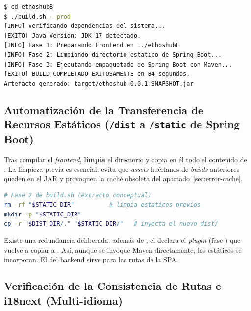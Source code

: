 \par\vspace{0.3cm}
\begin{lstlisting}[language=bash]
$ cd ethoshubB
$ ./build.sh --prod
[INFO] Verificando dependencias del sistema...
[EXITO] Java Version: JDK 17 detectado.
[INFO] Fase 1: Preparando Frontend en ../ethoshubF
[INFO] Fase 2: Limpiando directorio estatico de Spring Boot...
[INFO] Fase 3: Ejecutando empaquetado de Spring Boot con Maven...
[EXITO] BUILD COMPLETADO EXITOSAMENTE en 84 segundos.
Artefacto generado: target/ethoshub-0.0.1-SNAPSHOT.jar
\end{lstlisting}

\subsection[Transferencia de Recursos Estáticos]{Automatización de la Transferencia de Recursos Estáticos (\texttt{/dist} a \texttt{/static} de Spring Boot)}%
\label{subsec:transferencia}

Tras compilar el \textit{frontend},  \textbf{limpia} el directorio
 y copia en él todo el contenido de
. La limpieza previa es esencial: evita que \textit{assets} huérfanos de
\textit{builds} anteriores queden en el JAR y provoquen la caché obsoleta del
apartado~\ref{sec:error-cache}.\par

\begin{lstlisting}[language=bash]
# Fase 2 de build.sh (extracto conceptual)
rm -rf "$STATIC_DIR"          # limpia estaticos previos
mkdir -p "$STATIC_DIR"
cp -r "$DIST_DIR/." "$STATIC_DIR/"   # inyecta el nuevo dist/
\end{lstlisting}

\begin{NotaConfiguracion}
Existe una redundancia deliberada: además de , el 
declara el \textit{plugin}  (fase )
que vuelve a copiar  a . Así, aunque se
invoque Maven directamente, los estáticos se incorporan. El 
del backend sirve  para las rutas de la SPA.
\end{NotaConfiguracion}

\subsection[Consistencia de Rutas e i18next]{Verificación de la Consistencia de Rutas e i18next (Multi-idioma)}%
\label{subsec:i18next}

